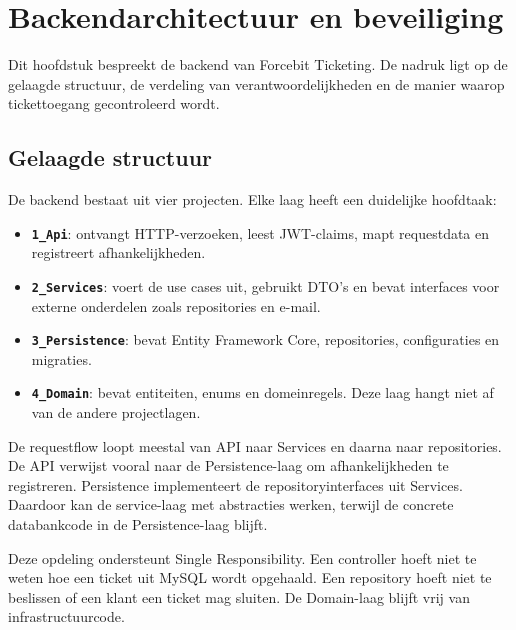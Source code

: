 
\chapter{Backendarchitectuur en beveiliging}%
\label{ch:backendarchitectuur}
\label{ch:architectuur-implementatie}

Dit hoofdstuk bespreekt de backend van Forcebit Ticketing. De nadruk ligt op de gelaagde structuur, de verdeling van verantwoordelijkheden en de manier waarop tickettoegang gecontroleerd wordt.

\section{Gelaagde structuur}

De backend bestaat uit vier projecten. Elke laag heeft een duidelijke hoofdtaak:

\begin{itemize}[itemsep=0.2\baselineskip, topsep=0.25\baselineskip]
  \item \textbf{\texttt{1\_Api}}: ontvangt HTTP-verzoeken, leest JWT-claims, mapt requestdata en registreert afhankelijkheden.
  \item \textbf{\texttt{2\_Services}}: voert de use cases uit, gebruikt DTO's en bevat interfaces voor externe onderdelen zoals repositories en e-mail.
  \item \textbf{\texttt{3\_Persistence}}: bevat Entity Framework Core, repositories, configuraties en migraties.
  \item \textbf{\texttt{4\_Domain}}: bevat entiteiten, enums en domeinregels. Deze laag hangt niet af van de andere projectlagen.
\end{itemize}

De requestflow loopt meestal van API naar Services en daarna naar repositories. De API verwijst vooral naar de Persistence-laag om afhankelijkheden te registreren. Persistence implementeert de repositoryinterfaces uit Services. Daardoor kan de service-laag met abstracties werken, terwijl de concrete databankcode in de Persistence-laag blijft.

Deze opdeling ondersteunt Single Responsibility. Een controller hoeft niet te weten hoe een ticket uit MySQL wordt opgehaald. Een repository hoeft niet te beslissen of een klant een ticket mag sluiten. De Domain-laag blijft vrij van infrastructuurcode.

